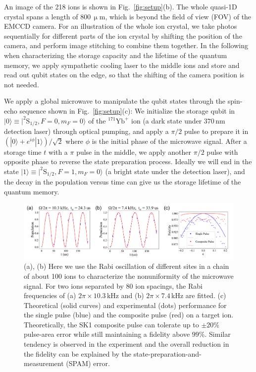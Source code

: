 \documentclass[aps,prl,reprint,superscriptaddress,twocolumn,longbibliography]{revtex4-1}
\begin{document}
An image of the 218 ions is shown in Fig.~\ref{fig:setup}(b). The whole quasi-1D crystal spans a length of $800\,\upmu$m, which is beyond the field of view (FOV) of the EMCCD camera. For an illustration of the whole ion crystal, we take photos sequentially for different parts of the ion crystal by shifting the position of the camera, and perform image stitching to combine them together. In the following when characterizing the storage capacity and the lifetime of the quantum memory, we apply sympathetic cooling laser to the middle ions \cite{PhysRevLett.127.143201} and store and read out qubit states on the edge, so that the shifting of the camera position is not needed.

We apply a global microwave to manipulate the qubit states through the spin-echo sequence shown in Fig.~\ref{fig:setup}(c): We initialize the storage qubit in $|0\rangle \equiv |^{2}\mathrm{S}_{1/2},F=0,m_F=0\rangle$ of the $^{171}\mathrm{Yb}^+$ ion (a dark state under $370\,$nm detection laser) through optical pumping, and apply a $\pi/2$ pulse to prepare it in $(|0\rangle+e^{i\phi}|1\rangle)/\sqrt{2}$ where $\phi$ is the initial phase of the microwave signal. After a storage time $t$ with a $\pi$ pulse in the middle, we apply another $\pi/2$ pulse with opposite phase to reverse the state preparation process. Ideally we will end in the state $|1\rangle \equiv |^{2}\mathrm{S}_{1/2},F=1,m_F=0\rangle$ (a bright state under the detection laser), and the decay in the population versus time can give us the storage lifetime of the quantum memory.

\begin{figure}[!tbp]
  \centering
  \includegraphics[width=\linewidth]{Fig2.pdf}
  \caption{(a), (b) Here we use the Rabi oscillation of different sites in a chain of about 100 ions to characterize the nonuniformity of the microwave signal. For two ions separated by 80 ion spacings, the Rabi frequencies of (a) $2\pi\times 10.3\,$kHz and (b) $2\pi\times 7.4\,$kHz are fitted. (c) Theoretical (solid curves) and experimental (dots) performance for the single pulse (blue) and the composite pulse (red) on a target ion. Theoretically, the SK1 composite pulse can tolerate up to $\pm 20\%$ pulse-area error while still maintaining a fidelity above $99\%$. Similar tendency is observed in the experiment and the overall reduction in the fidelity can be explained by the state-preparation-and-measurement (SPAM) error.}\label{fig:composite}
\end{figure}
\end{document}
